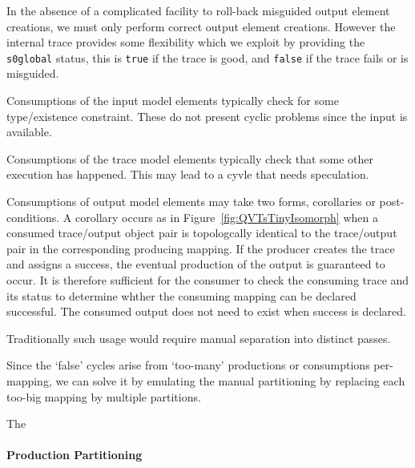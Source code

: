\documentclass{jot}
\begin{document}
In the absence of a complicated facility to roll-back misguided output element creations, we must only perform correct output element creations. However the internal trace provides some flexibility which we exploit by providing the \verb|s0global| status, this is \verb|true| if the trace is good, and \verb|false| if the trace fails or is misguided.

Consumptions of the input model elements typically check for some type/existence constraint. These do not present cyclic problems since the input is available.

Consumptions of the trace model elements typically check that some other execution has happened. This may lead to a cyvle that needs speculation.

Consumptions of output model elements may take two forms, corollaries or post-conditions.
A corollary occurs as in Figure~\ref{fig:QVTsTinyIsomorph} when a consumed trace/output object pair is topologcally identical to the trace/output pair in the corresponding producing mapping. If the producer creates the trace and assigns a success, the eventual production of the output is guaranteed to occur. It is therefore sufficient for the consumer to check the consuming trace and its status to determine whther the consuming mapping can be declared successful. The consumed output does not need to exist when success is declared.
 

Traditionally such usage would require manual separation into distinct passes.

Since the `false' cycles arise from `too-many' productions or consumptions per-mapping, we can solve it by emulating the manual partitioning by replacing each too-big mapping by multiple partitions.

The


\paragraph{Production Partitioning}
\end{document}

